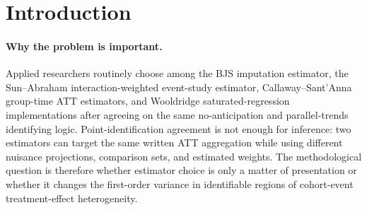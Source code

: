 \documentclass[11pt]{article}
\theoremstyle{definition}
\theoremstyle{plain}
\theoremstyle{remark}
\begin{document}
\begin{abstract}
Modern staggered-DiD papers now agree on how to identify interpretable
group-time and event-study ATT parameters under no anticipation and parallel
trends, but they do not give a sharp frontier for when the leading robust
estimators have the same first-order influence function.  This proposal asks
for a closed-form spectral condition under which the BJS imputation estimator,
Sun--Abraham interaction-weighted estimator, Callaway--Sant'Anna group-time
doubly robust aggregation, and Wooldridge saturated-TWFE implementation have
the same canonical normalized influence function for one fixed ATT aggregation.
The flagship
conjecture is that equivalence is governed by the row-space of an explicit
covariance-whitened pre-period contrast kernel \(H(\pi,\Sigma,a)\): rows of the
residualized heterogeneity matrix outside this active row-space force strict
first-order variance separation, while rows inside it collapse the four
estimators to the same canonical score.  The proposal deliberately formulates the rank
boundary as an integer active-rank certificate, avoiding the ill-posed shortcut
``rank less than a singular value.''  Resolving the conjecture would turn the
current estimator-choice discussion into a computable diagnostic based on
canonical normalized influence functions, cohort shares, pre-period covariance,
and the observed event-study design.
\end{abstract}

\section{Introduction}
\paragraph{Why the problem is important.}
Applied researchers routinely choose among the BJS imputation estimator, the
Sun--Abraham interaction-weighted event-study estimator, Callaway--Sant'Anna
group-time ATT estimators, and Wooldridge saturated-regression implementations
after agreeing on the same no-anticipation and parallel-trends identifying
logic.  Point-identification agreement is not enough for inference: two
estimators can target the same written ATT aggregation while using different
nuisance projections, comparison sets, and estimated weights.  The methodological
question is therefore whether estimator choice is only a matter of presentation
or whether it changes the first-order variance in identifiable regions of
cohort-event treatment-effect heterogeneity.
\end{document}
